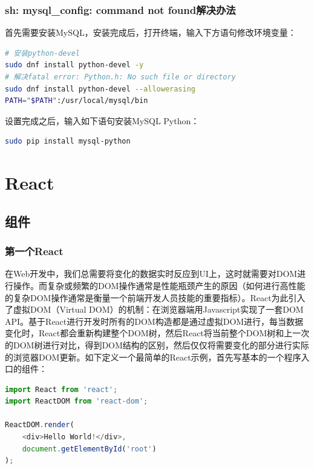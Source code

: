 \documentclass[letter]{book}
\begin{document}
\subsection{sh: mysql\_config: command not found解决办法}

首先需要安装MySQL，安装完成后，打开终端，输入下方语句修改环境变量：

\begin{lstlisting}[language=Bash]
# 安装python-devel
sudo dnf install python-devel -y
# 解决fatal error: Python.h: No such file or directory
sudo dnf install python-devel --allowerasing
PATH="$PATH":/usr/local/mysql/bin
\end{lstlisting}

设置完成之后，输入如下语句安装MySQL Python：

\begin{lstlisting}[language=Bash]
sudo pip install mysql-python
\end{lstlisting}

\chapter{React}

\section{组件}

\subsection{第一个React}

在Web开发中，我们总需要将变化的数据实时反应到UI上，这时就需要对DOM进行操作。而复杂或频繁的DOM操作通常是性能瓶颈产生的原因（如何进行高性能的复杂DOM操作通常是衡量一个前端开发人员技能的重要指标）。React为此引入了虚拟DOM（Virtual DOM）的机制：在浏览器端用Javascript实现了一套DOM API。基于React进行开发时所有的DOM构造都是通过虚拟DOM进行，每当数据变化时，React都会重新构建整个DOM树，然后React将当前整个DOM树和上一次的DOM树进行对比，得到DOM结构的区别，然后仅仅将需要变化的部分进行实际的浏览器DOM更新。如下定义一个最简单的React示例，首先写基本的一个程序入口的组件：

\begin{lstlisting}[language=Javascript]
import React from 'react';
import ReactDOM from 'react-dom';

ReactDOM.render(
	<div>Hello World!</div>,
	document.getElementById('root')
);
\end{lstlisting}
\end{document}

